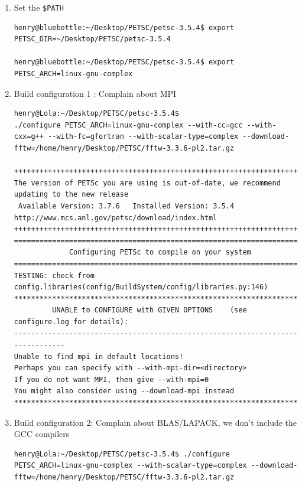 \documentclass{article}
\begin{document}
\begin{enumerate}
\item  Set the \verb+$PATH+
\scriptsize
\begin{verbatim}
henry@bluebottle:~/Desktop/PETSC/petsc-3.5.4$ export PETSC_DIR=~/Desktop/PETSC/petsc-3.5.4

henry@bluebottle:~/Desktop/PETSC/petsc-3.5.4$ export PETSC_ARCH=linux-gnu-complex
\end{verbatim}
\normalsize
\item Build configuration 1 : Complain about MPI
\tiny
\begin{verbatim}
henry@Lola:~/Desktop/PETSC/petsc-3.5.4$ 
./configure PETSC_ARCH=linux-gnu-complex --with-cc=gcc --with-cxx=g++ --with-fc=gfortran --with-scalar-type=complex --download-fftw=/home/henry/Desktop/PETSC/fftw-3.3.6-pl2.tar.gz

+++++++++++++++++++++++++++++++++++++++++++++++++++++++++++++++++++++++++++++++++++++++++++
The version of PETSc you are using is out-of-date, we recommend updating to the new release
 Available Version: 3.7.6   Installed Version: 3.5.4
http://www.mcs.anl.gov/petsc/download/index.html
+++++++++++++++++++++++++++++++++++++++++++++++++++++++++++++++++++++++++++++++++++++++++++
===============================================================================
             Configuring PETSc to compile on your system                       
===============================================================================
TESTING: check from config.libraries(config/BuildSystem/config/libraries.py:146)                                                                                                                            
*******************************************************************************
         UNABLE to CONFIGURE with GIVEN OPTIONS    (see configure.log for details):
-------------------------------------------------------------------------------
Unable to find mpi in default locations!
Perhaps you can specify with --with-mpi-dir=<directory>
If you do not want MPI, then give --with-mpi=0
You might also consider using --download-mpi instead
*******************************************************************************
\end{verbatim}
\normalsize
\item Build configuration 2: Complain about BLAS/LAPACK, we don't include the  GCC compilers 
\tiny
\begin{verbatim}
henry@Lola:~/Desktop/PETSC/petsc-3.5.4$ ./configure PETSC_ARCH=linux-gnu-complex --with-scalar-type=complex --download-fftw=/home/henry/Desktop/PETSC/fftw-3.3.6-pl2.tar.gz


\end{verbatim}
\end{enumerate}
\end{document}
